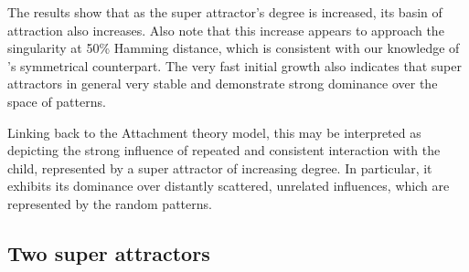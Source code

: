 The results show that as the super attractor's degree is increased, its basin of attraction also increases. Also note that this increase appears to approach the singularity at 50\% Hamming distance, which is consistent with our knowledge of \psuper's symmetrical counterpart. The very fast initial growth also indicates that super attractors in general very stable and demonstrate strong dominance over the space of patterns.


Linking back to the Attachment theory model, this may be interpreted as depicting the strong influence of repeated and consistent interaction with the child, represented by a super attractor of increasing degree. In particular, it exhibits its dominance over distantly scattered, unrelated influences, which are represented by the random patterns.



\subsection{Two super attractors}


\newcommand{\poriginsuper}{$p_{origin}$}
\newcommand{\pnewsuper}{$p_{new}$}
\newcommand{\dorigin}{$d_{origin}$}
\newcommand{\dnew}{$d_{new}$}


